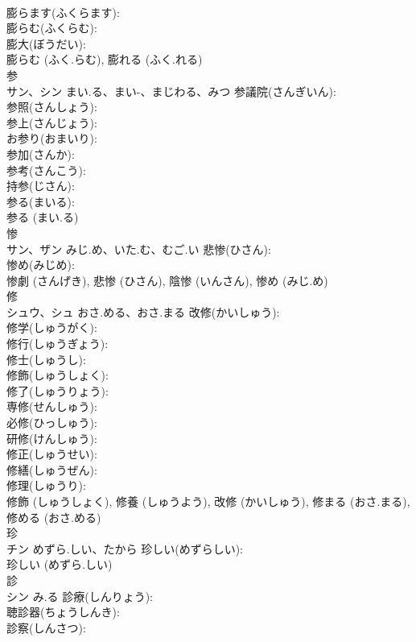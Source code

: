 \documentclass[8pt]{extreport}
\begin{document}
\begin{CJK}{UTF8}{min}
\\	膨らます(ふくらます): 
\\	膨らむ(ふくらむ): 
\\	膨大(ぼうだい): 
\\	膨らむ (ふく.らむ), 膨れる (ふく.れる)
\\	参			
\\	サン、シン	まい.る、まい-、まじわる、みつ	参議院(さんぎいん): 
\\	参照(さんしょう): 
\\	参上(さんじょう): 
\\	お参り(おまいり): 
\\	参加(さんか): 
\\	参考(さんこう): 
\\	持参(じさん): 
\\	参る(まいる): 
\\	参る (まい.る)
\\	惨			
\\	サン、ザン	みじ.め、いた.む、むご.い	悲惨(ひさん): 
\\	惨め(みじめ): 
\\	惨劇 (さんげき), 悲惨 (ひさん), 陰惨 (いんさん), 惨め (みじ.め)
\\	修			
\\	シュウ、シュ	おさ.める、おさ.まる	改修(かいしゅう): 
\\	修学(しゅうがく): 
\\	修行(しゅうぎょう): 
\\	修士(しゅうし): 
\\	修飾(しゅうしょく): 
\\	修了(しゅうりょう): 
\\	専修(せんしゅう): 
\\	必修(ひっしゅう): 
\\	研修(けんしゅう): 
\\	修正(しゅうせい): 
\\	修繕(しゅうぜん): 
\\	修理(しゅうり): 
\\	修飾 (しゅうしょく), 修養 (しゅうよう), 改修 (かいしゅう), 修まる (おさ.まる), 修める (おさ.める)
\\	珍			
\\	チン	めずら.しい、たから	珍しい(めずらしい): 
\\	珍しい (めずら.しい)
\\	診			
\\	シン	み.る	診療(しんりょう): 
\\	聴診器(ちょうしんき): 
\\	診察(しんさつ): 

\end{CJK}
\end{document}
